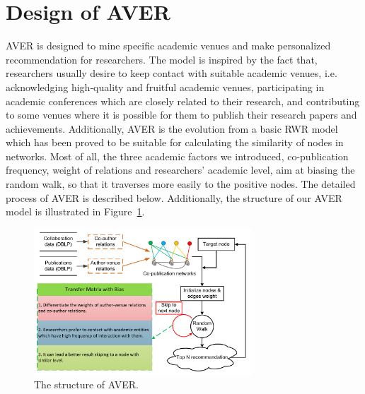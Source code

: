\documentclass[9pt]{acm_proc_article-sp}
\begin{document}
\section{Design of AVER}
AVER is designed to mine specific academic venues and make personalized recommendation for researchers. The model is inspired by the fact that, researchers usually desire to keep contact with suitable academic venues, i.e. acknowledging high-quality and fruitful academic venues, participating in academic conferences which are closely related to their research, and contributing to some venues where it is possible for them to publish their research papers and achievements. Additionally, AVER is the evolution from a basic RWR model which has been proved to be suitable for calculating the similarity of nodes in networks. Most of all, the three academic factors we introduced, co-publication frequency, weight of relations and researchers' academic level, aim at biasing the random walk, so that it traverses more easily to the positive nodes. The detailed process of AVER is described below. Additionally, the structure of our AVER model is illustrated in Figure~\ref{Fig1}.
\begin{figure}[!ht]
\centering
\includegraphics [width=3.2in]{Fig1.pdf}
\caption{The structure of AVER.}
\label{Fig1}
\end{figure}
\end{document}
